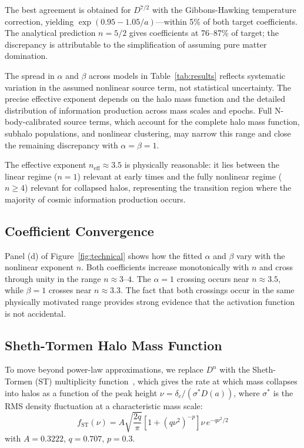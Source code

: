 \documentclass[twocolumn,superscriptaddress,prl,amsmath,amssymb]{revtex4-2}
\begin{document}
The best agreement is obtained for $D^{7/2}$ with the Gibbons-Hawking temperature correction, yielding $\exp(0.95 - 1.05/a)$---within 5\% of both target coefficients. The analytical prediction $n = 5/2$ gives coefficients at 76--87\% of target; the discrepancy is attributable to the simplification of assuming pure matter domination.

The spread in $\alpha$ and $\beta$ across models in Table~\ref{tab:results} reflects systematic variation in the assumed nonlinear source term, not statistical uncertainty. The precise effective exponent depends on the halo mass function and the detailed distribution of information production across mass scales and epochs. Full N-body-calibrated source terms, which account for the complete halo mass function, subhalo populations, and nonlinear clustering, may narrow this range and close the remaining discrepancy with $\alpha = \beta = 1$.

The effective exponent $n_\text{eff} \approx 3.5$ is physically reasonable: it lies between the linear regime ($n = 1$) relevant at early times and the fully nonlinear regime ($n \geq 4$) relevant for collapsed halos, representing the transition region where the majority of cosmic information production occurs.

\subsection{Coefficient Convergence}

Panel (d) of Figure~\ref{fig:technical} shows how the fitted $\alpha$ and $\beta$ vary with the nonlinear exponent $n$. Both coefficients increase monotonically with $n$ and cross through unity in the range $n \approx 3$--$4$. The $\alpha = 1$ crossing occurs near $n \approx 3.5$, while $\beta = 1$ crosses near $n \approx 3.3$. The fact that both crossings occur in the same physically motivated range provides strong evidence that the activation function is not accidental.

\subsection{Sheth-Tormen Halo Mass Function}

To move beyond power-law approximations, we replace $D^n$ with the Sheth-Tormen (ST) multiplicity function~\cite{Sheth1999}, which gives the rate at which mass collapses into halos as a function of the peak height $\nu = \delta_c / (\sigma^* D(a))$, where $\sigma^*$ is the RMS density fluctuation at a characteristic mass scale:
\begin{equation}
f_\text{ST}(\nu) = A\sqrt{\frac{2q}{\pi}}\left[1 + (q\nu^2)^{-p}\right]\nu \, e^{-q\nu^2/2}
\end{equation}
with $A = 0.3222$, $q = 0.707$, $p = 0.3$.
\end{document}
